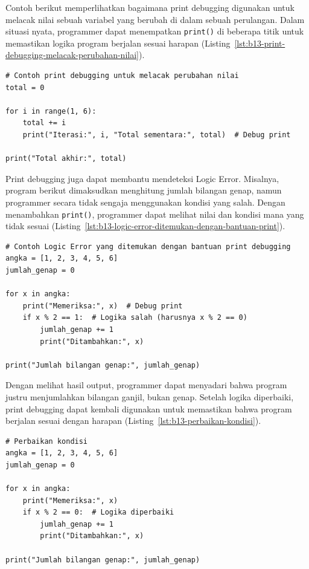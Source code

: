 Contoh berikut memperlihatkan bagaimana print debugging digunakan untuk melacak nilai sebuah variabel yang berubah di dalam sebuah perulangan. Dalam situasi nyata, programmer dapat menempatkan \texttt{print()} di beberapa titik untuk memastikan logika program berjalan sesuai harapan (Listing~\ref{lst:b13-print-debugging-melacak-perubahan-nilai}).

\begin{lstlisting}[style=PythonStyle, caption={Contoh print debugging untuk melacak perubahan nilai}, label={lst:b13-print-debugging-melacak-perubahan-nilai}]
# Contoh print debugging untuk melacak perubahan nilai
total = 0

for i in range(1, 6):
    total += i
    print("Iterasi:", i, "Total sementara:", total)  # Debug print

print("Total akhir:", total)
\end{lstlisting}

Print debugging juga dapat membantu mendeteksi Logic Error. Misalnya, program berikut dimaksudkan menghitung jumlah bilangan genap, namun programmer secara tidak sengaja menggunakan kondisi yang salah. Dengan menambahkan \texttt{print()}, programmer dapat melihat nilai dan kondisi mana yang tidak sesuai (Listing~\ref{lst:b13-logic-error-ditemukan-dengan-bantuan-print}).

\begin{lstlisting}[style=PythonStyle, caption={Contoh Logic Error yang ditemukan dengan bantuan print debugging}, label={lst:b13-logic-error-ditemukan-dengan-bantuan-print}]
# Contoh Logic Error yang ditemukan dengan bantuan print debugging
angka = [1, 2, 3, 4, 5, 6]
jumlah_genap = 0
 
for x in angka:
    print("Memeriksa:", x)  # Debug print
    if x % 2 == 1:  # Logika salah (harusnya x % 2 == 0)
        jumlah_genap += 1
        print("Ditambahkan:", x)

print("Jumlah bilangan genap:", jumlah_genap)
\end{lstlisting}

Dengan melihat hasil output, programmer dapat menyadari bahwa program justru menjumlahkan bilangan ganjil, bukan genap. Setelah logika diperbaiki, print debugging dapat kembali digunakan untuk memastikan bahwa program berjalan sesuai dengan harapan (Listing~\ref{lst:b13-perbaikan-kondisi}).

\begin{lstlisting}[style=PythonStyle, caption={Perbaikan kondisi}, label={lst:b13-perbaikan-kondisi}]
# Perbaikan kondisi
angka = [1, 2, 3, 4, 5, 6]
jumlah_genap = 0

for x in angka:
    print("Memeriksa:", x)
    if x % 2 == 0:  # Logika diperbaiki
        jumlah_genap += 1
        print("Ditambahkan:", x)

print("Jumlah bilangan genap:", jumlah_genap)
\end{lstlisting}

